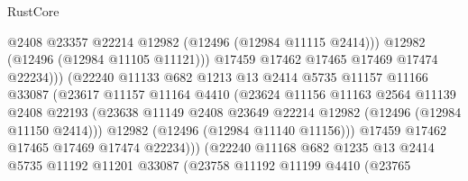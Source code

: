 \begin{lexlean}{RustCore}
\begin{coremodule}
                                      @2408
                                      @23357
                                      @22214
                                      @12982
                                      (@12496 (@12984 @11115 @2414)))
                                    @12982
                                    (@12496 (@12984 @11105 @11121)))
                                  @17459
                                  @17462
                                  @17465
                                  @17469
                                  @17474
                                  @22234)))
                            (@22240
                              @11133
                              @682
                              @1213
                              @13
                              @2414
                              @5735
                              @11157
                              @11166
                              @33087
                              (@23617
                                @11157
                                @11164
                                @4410
                                (@23624
                                  @11156
                                  @11163
                                  @2564
                                  @11139
                                  @2408
                                  @22193
                                  (@23638
                                    @11149
                                    @2408
                                    @23649
                                    @22214
                                    @12982
                                    (@12496 (@12984 @11150 @2414)))
                                  @12982
                                  (@12496 (@12984 @11140 @11156)))
                                @17459
                                @17462
                                @17465
                                @17469
                                @17474
                                @22234)))
                          (@22240
                            @11168
                            @682
                            @1235
                            @13
                            @2414
                            @5735
                            @11192
                            @11201
                            @33087
                            (@23758
                              @11192
                              @11199
                              @4410
                              (@23765

\end{coremodule}
\end{lexlean}
